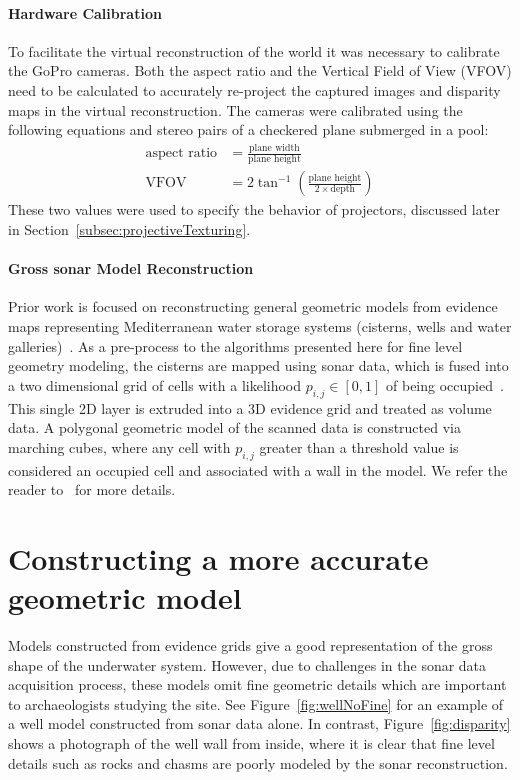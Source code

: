 \documentclass{llncs}
\begin{document}
\paragraph{Hardware Calibration}
To facilitate the virtual reconstruction of the world it was necessary to calibrate the GoPro cameras.
Both the aspect ratio and the Vertical Field of View (VFOV) need to be calculated to accurately re-project the captured images and disparity maps in the virtual reconstruction.
The cameras were calibrated using the following equations and stereo pairs of a checkered plane submerged in a pool:
\begin{align}
\text{aspect ratio} &= \frac{\text{plane width}}{\text{plane height}} \\
\text{VFOV} &= 2\tan^{-1}\left({\frac{\text{plane height}}{2 \times \text{depth}}}\right)
\end{align}
These two values were used to specify the behavior of projectors, discussed later in Section~\ref{subsec:projectiveTexturing}.

\paragraph{Gross sonar Model Reconstruction}
\label{sec:reconstruction}
\noindent Prior work is focused on reconstructing general geometric models from evidence maps representing Mediterranean water storage systems (cisterns, wells and water galleries)~\cite{ICEX11,McVicker}. As a pre-process to the algorithms presented here for fine level geometry modeling, the cisterns are mapped using sonar data, which is fused into a two dimensional grid of cells with a likelihood $p_{i,j} \in [0,1]$ of being occupied~\cite{Thrun2005,White10}. This single 2D layer is extruded into a 3D evidence grid and treated as volume data. A polygonal geometric model of the scanned data is constructed via marching cubes, where any cell with $p_{i,j}$ greater than a threshold value is considered an occupied cell and associated with a wall in the model.
We refer the reader to~\cite{ICEX11,McVicker} for more details.

\section{Constructing a more accurate geometric model}
\label{sec:detail}
\noindent Models constructed from evidence grids give a good representation of the gross shape of the underwater system. However, due to challenges in the sonar data acquisition process, these models omit fine geometric details which are important to archaeologists studying the site. See Figure~\ref{fig:wellNoFine} for an example of a well model constructed from sonar data alone. In contrast, Figure~\ref{fig:disparity} shows a photograph of the well wall from inside, where it is clear that fine level details such as rocks and chasms are poorly modeled by the sonar reconstruction.
\end{document}
